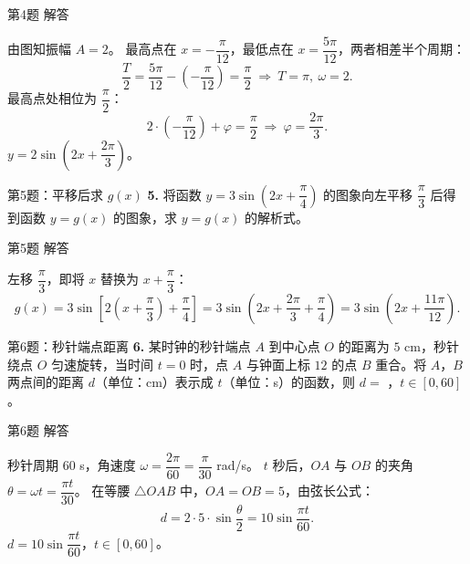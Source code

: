 \documentclass[10pt,aspectratio=169,serif]{beamer}
\begin{document}
\begin{frame}[t]{第4题 解答}
\begin{tcolorbox}[colback=orange!10,colframe=orange,title=\textbf{解}]
由图知振幅 $A=2$。
最高点在 $x=-\dfrac{\pi}{12}$，最低点在 $x=\dfrac{5\pi}{12}$，两者相差半个周期：
\[
\frac{T}{2}=\frac{5\pi}{12}-\!\left(-\frac{\pi}{12}\right)=\frac{\pi}{2}\ \Longrightarrow\ T=\pi,\ \omega=2.
\]
最高点处相位为 $\dfrac{\pi}{2}$：
\[
2\cdot\!\left(-\frac{\pi}{12}\right)+\varphi=\frac{\pi}{2}\ \Longrightarrow\ \varphi=\frac{2\pi}{3}.
\]
\alert{$y=2\sin\!\left(2x+\dfrac{2\pi}{3}\right)$}。
\end{tcolorbox}
\end{frame}

\begin{frame}[t]{第5题：平移后求 $g(x)$}
\textbf{5.} 将函数 $y=3\sin\!\left(2x+\dfrac{\pi}{4}\right)$ 的图象向左平移 $\dfrac{\pi}{3}$ 后得到函数 $y=g(x)$ 的图象，求 $y=g(x)$ 的解析式。
\end{frame}

\begin{frame}[t]{第5题 解答}
\begin{tcolorbox}[colback=orange!10,colframe=orange,title=\textbf{解}]
左移 $\dfrac{\pi}{3}$，即将 $x$ 替换为 $x+\dfrac{\pi}{3}$：
\[
g(x)=3\sin\!\left[2\!\left(x+\frac{\pi}{3}\right)+\frac{\pi}{4}\right]
=3\sin\!\left(2x+\frac{2\pi}{3}+\frac{\pi}{4}\right)
=3\sin\!\left(2x+\frac{11\pi}{12}\right).
\]
\end{tcolorbox}
\end{frame}

\begin{frame}[t]{第6题：秒针端点距离}
\textbf{6.} 某时钟的秒针端点 $A$ 到中心点 $O$ 的距离为 $5$ cm，秒针绕点 $O$ 匀速旋转，当时间 $t=0$ 时，点 $A$ 与钟面上标 $12$ 的点 $B$ 重合。将 $A$，$B$ 两点间的距离 $d$（单位：cm）表示成 $t$（单位：s）的函数，则 $d=$ \underline{\hspace{2cm}}，$t\in[0,60]$。
\end{frame}

\begin{frame}[t]{第6题 解答}
\begin{tcolorbox}[colback=orange!10,colframe=orange,title=\textbf{解}]
秒针周期 $60$ s，角速度 $\omega=\dfrac{2\pi}{60}=\dfrac{\pi}{30}$ rad/s。
$t$ 秒后，$OA$ 与 $OB$ 的夹角 $\theta=\omega t=\dfrac{\pi t}{30}$。
在等腰 $\triangle OAB$ 中，$OA=OB=5$，由弦长公式：
\[
d=2\cdot 5\cdot\sin\frac{\theta}{2}=10\sin\frac{\pi t}{60}.
\]
\alert{$d=10\sin\dfrac{\pi t}{60}$，$t\in[0,60]$}。
\end{tcolorbox}
\end{frame}
\end{document}
